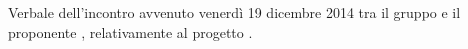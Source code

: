 Verbale dell'incontro avvenuto venerdì 19 dicembre 2014 tra il gruppo \gruppo e il proponente \proponente, relativamente al progetto \progetto.
